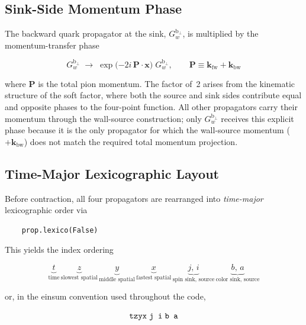 \documentclass[11pt,a4paper]{article}
\newcommand{\walltag}[1]{\texttt{#1}}
\begin{document}
\subsection{Sink-Side Momentum Phase}

The backward quark propagator at the sink, $G_{w}^{\mathrm{b}_{\perp}}$, is multiplied
by the momentum-transfer phase

\begin{equation}\label{eq:sink_phase}
G_{w}^{\mathrm{b}_{\perp}}
\;\longrightarrow\;
\exp\!\big({-2i\,\mathbf{P}\!\cdot\!\mathbf{x}}\big)\;
G_{w}^{\mathrm{b}_{\perp}} ,
\qquad
\mathbf{P} \equiv \mathbf{k}_{\mathrm{fw}} + \mathbf{k}_{\mathrm{bw}}
\end{equation}

where $\mathbf{P}$ is the total pion momentum.  The factor of~2 arises from the
kinematic structure of the soft factor, where both the source and sink sides
contribute equal and opposite phases to the four-point function.  All other
propagators carry their momentum through the wall-source construction; only
$G_{w}^{\mathrm{b}_{\perp}}$ receives this explicit phase because it is the only
propagator for which the wall-source momentum ($+\mathbf{k}_{\mathrm{bw}}$) does not
match the required total momentum projection.

\subsection{Time-Major Lexicographic Layout}

Before contraction, all four propagators are rearranged into \emph{time-major}
lexicographic order via

\begin{verbatim}
    prop.lexico(False)
\end{verbatim}

This yields the index ordering

\begin{equation}
\underbrace{t}_{\text{time}}\,
\underbrace{z}_{\text{slowest spatial}}\,
\underbrace{y}_{\text{middle spatial}}\,
\underbrace{x}_{\text{fastest spatial}}\,
\underbrace{j,\,i}_{\text{spin sink, source}}\,
\underbrace{b,\,a}_{\text{color sink, source}}
\end{equation}

or, in the einsum convention used throughout the code,

\begin{equation}
\text{\walltag{tzyx\;j i\;b a}}
\end{equation}
\end{document}
